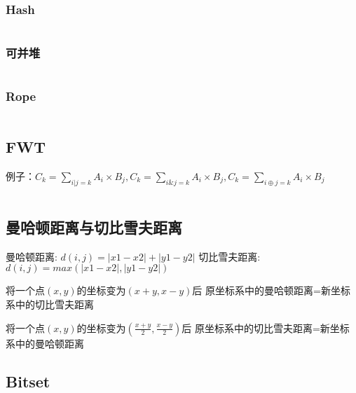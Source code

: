 \documentclass[a4paper,fleqn,11pt]{article}
\begin{document}
\subsubsection{Hash}
\inputminted[breaklines]{c++}{黑科技/Hash.cpp}
\subsubsection{可并堆}
\inputminted[breaklines]{c++}{黑科技/Heap.cpp}
\subsubsection{Rope}
\inputminted[breaklines]{c++}{黑科技/Rope.cpp}

\subsection{FWT}
例子：$C_k=\sum_{i|j=k}A_i×B_j,C_k=\sum_{i\&j=k}A_i×B_j,C_k=\sum_{i\oplus j=k}A_i×B_j$
\inputminted[breaklines]{c++}{黑科技/Fwt.cpp}

\subsection{曼哈顿距离与切比雪夫距离}
曼哈顿距离: $d(i,j)=|x1-x2|+|y1-y2|$
切比雪夫距离: $d(i,j)=max(|x1-x2|,|y1-y2|)$

将一个点$(x,y)$的坐标变为$(x+y,x-y)$后
原坐标系中的曼哈顿距离=新坐标系中的切比雪夫距离

将一个点$(x,y)$的坐标变为$(\frac{x+y}{2},\frac{x-y}{2})$后
原坐标系中的切比雪夫距离=新坐标系中的曼哈顿距离

\subsection{Bitset}
\inputminted[breaklines]{c++}{黑科技/Bitset.cpp}

\end{document}
